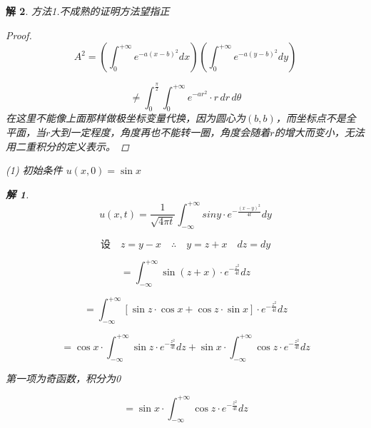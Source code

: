 \documentclass[12pt,a4paper]{article}
\newtheorem*{solution}{解}
\begin{document}
\begin{solution}
方法1.不成熟的证明方法望指正
	\begin{proof}
	\begin{equation*}
		A^2 = \left( \int_{0}^{+\infty} e^{-a(x-b)^2} dx \right) \left( \int_{0}^{+\infty} e^{-a(y-b)^2} dy \right)
	\end{equation*}
	
	\begin{equation*}
		\neq \int_{0}^{\frac{\pi}{2}} \int_{0}^{+\infty} e^{-ar^2} \cdot r \, dr \, d\theta
	\end{equation*}
	在这里不能像上面那样做极坐标变量代换，因为圆心为$(b,b)$，而坐标点不是全平面，当$r$大到一定程度，角度再也不能转一圈，角度会随着$r$的增大而变小，无法用二重积分的定义表示。

	
	\end{proof}

	
	
	
		
		

		
	
	
	\newpage
(1) 初始条件 \( u(x,0) = \sin x \)
	
	\begin{solution}
		\begin{equation*}
			u(x,t)=\frac{1}{\sqrt{4\pi t}}\int_{-\infty}^{+\infty}siny\cdot e^{-\frac{(x-y)^2}{4t}}dy
		\end{equation*}
		
		\begin{equation*}
			\text{设} \quad z = y - x \quad \therefore \quad y = z + x \quad dz = dy
		\end{equation*}
		
		\begin{equation*}
			= \int_{-\infty}^{+\infty} \sin(z + x) \cdot e^{-\frac{z^2}{4t}} dz
		\end{equation*}
		
		\begin{equation*}
			= \int_{-\infty}^{+\infty} [\sin z \cdot \cos x + \cos z \cdot \sin x] \cdot e^{-\frac{z^2}{4t}} dz
		\end{equation*}
		
		\begin{equation*}
			= \cos x \cdot \int_{-\infty}^{+\infty} \sin z \cdot e^{-\frac{z^2}{4t}} dz + \sin x \cdot \int_{-\infty}^{+\infty} \cos z \cdot e^{-\frac{z^2}{4t}} dz
		\end{equation*}
		
	第一项为奇函数，积分为0
		
		\begin{equation*}
			=  \sin x \cdot \int_{-\infty}^{+\infty} \cos z \cdot e^{-\frac{z^2}{4t}} dz
		\end{equation*}
		

\end{solution}
\end{solution}
\end{document}
